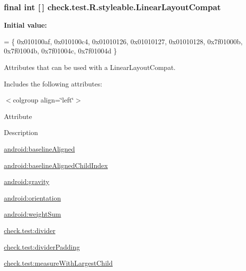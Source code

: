 \subsubsection[{Linear\+Layout\+Compat}]{\setlength{\rightskip}{0pt plus 5cm}final int \mbox{[}$\,$\mbox{]} check.\+test.\+R.\+styleable.\+Linear\+Layout\+Compat\hspace{0.3cm}{\ttfamily [static]}}\label{classcheck_1_1test_1_1_r_1_1styleable_a1cee5a37a541e5cb360983f35ebfe0fc}
{\bfseries Initial value\+:}
\begin{DoxyCode}
= \{
            0x010100af, 0x010100c4, 0x01010126, 0x01010127,
            0x01010128, 0x7f01000b, 0x7f01004b, 0x7f01004c,
            0x7f01004d
        \}
\end{DoxyCode}
Attributes that can be used with a Linear\+Layout\+Compat. 

Includes the following attributes\+:

\begin{TabularC}{0}
\hline
\end{TabularC}
$<$colgroup align=\char`\"{}left\char`\"{}$>$ 

Attribute

Description 

{\ttfamily \hyperlink{classcheck_1_1test_1_1_r_1_1styleable_a67d8b5abe1097b46cea7bee93c465465}{android\+:baseline\+Aligned}}

{\ttfamily \hyperlink{classcheck_1_1test_1_1_r_1_1styleable_a856d64f5e68d12a9b3a5daaacfa57e7b}{android\+:baseline\+Aligned\+Child\+Index}}

{\ttfamily \hyperlink{classcheck_1_1test_1_1_r_1_1styleable_abe8ac977e2400616ce150828d8ec6a26}{android\+:gravity}}

{\ttfamily \hyperlink{classcheck_1_1test_1_1_r_1_1styleable_a7888ca0cf0cdae867cd8a4826d080062}{android\+:orientation}}

{\ttfamily \hyperlink{classcheck_1_1test_1_1_r_1_1styleable_ae245bae0548f5ad66ca9cf0a1cdb45b4}{android\+:weight\+Sum}}

{\ttfamily \hyperlink{classcheck_1_1test_1_1_r_1_1styleable_ac11ca4a97787af8e1f1d162edcc0c436}{check.\+test\+:divider}}

{\ttfamily \hyperlink{classcheck_1_1test_1_1_r_1_1styleable_afdc801825abf8606d597921106733dda}{check.\+test\+:divider\+Padding}}

{\ttfamily \hyperlink{classcheck_1_1test_1_1_r_1_1styleable_a68068887a622f9abc4411ad0205c6676}{check.\+test\+:measure\+With\+Largest\+Child}}

